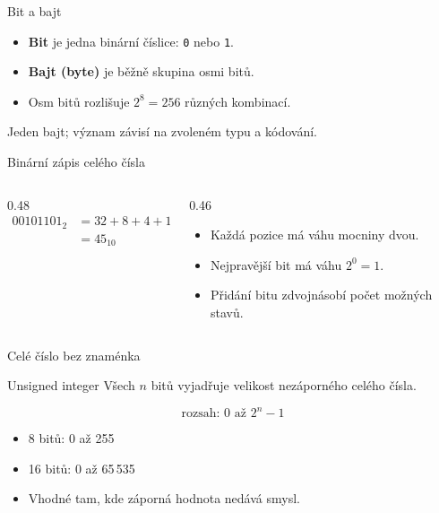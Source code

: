 \documentclass[aspectratio=169]{beamer}
\newcommand{\term}[1]{\textcolor{CodeBlue}{\textbf{#1}}}
\begin{document}
\begin{frame}{Bit a bajt}
  \begin{itemize}
    \item \term{Bit} je jedna binární číslice: \texttt{0} nebo \texttt{1}.
    \item \term{Bajt (byte)} je běžně skupina osmi bitů.
    \item Osm bitů rozlišuje $2^8=256$ různých kombinací.
  \end{itemize}
  \vspace{5mm}
  \centering
  \Large{}
  \par\normalsize\rmfamily
  \vspace{3mm}
  Jeden bajt; význam závisí na zvoleném typu a kódování.
\end{frame}

\begin{frame}{Binární zápis celého čísla}
  \begin{columns}[T]
    \begin{column}{0.48\textwidth}
      \centering
      \large{}\rmfamily
      \begin{align*}
        00101101_2
          &= 32+8+4+1 \\
          &= 45_{10}
      \end{align*}
    \end{column}
    \begin{column}{0.46\textwidth}
      \begin{itemize}
        \item Každá pozice má váhu mocniny dvou.
        \item Nejpravější bit má váhu $2^0=1$.
        \item Přidání bitu zdvojnásobí počet možných stavů.
      \end{itemize}
    \end{column}
  \end{columns}
\end{frame}

\begin{frame}{Celé číslo bez znaménka}
  \begin{block}{Unsigned integer}
    Všech $n$ bitů vyjadřuje velikost nezáporného celého čísla.
  \end{block}
  \[
    \text{rozsah: } 0 \text{ až } 2^n-1
  \]
  \begin{itemize}
    \item 8 bitů: 0 až 255
    \item 16 bitů: 0 až 65\,535
    \item Vhodné tam, kde záporná hodnota nedává smysl.
  \end{itemize}
\end{frame}
\end{document}
